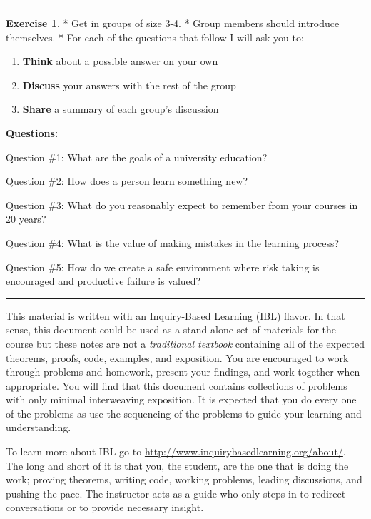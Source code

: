 \documentclass[
]{book}
\providecommand{\tightlist}{%
  \setlength{\itemsep}{0pt}\setlength{\parskip}{0pt}}
\theoremstyle{definition}
\theoremstyle{definition}
\theoremstyle{definition}
\newtheorem{exercise}{Exercise}[chapter]
\theoremstyle{remark}
\begin{document}
\begin{center}\rule{0.5\linewidth}{0.5pt}\end{center}

\begin{exercise}
\protect\hypertarget{exr:unnamed-chunk-2}{}{\label{exr:unnamed-chunk-2} }
* Get in groups of size 3-4.
* Group members should introduce themselves.
* For each of the questions that follow I will ask you to:

\begin{enumerate}
\def\labelenumi{\arabic{enumi}.}
\tightlist
\item
  \textbf{Think} about a possible answer on your own
\item
  \textbf{Discuss} your answers with the rest of the group
\item
  \textbf{Share} a summary of each group's discussion
\end{enumerate}

\textbf{Questions:}

Question \#1: What are the goals of a university education?

Question \#2: How does a person learn something new?

Question \#3: What do you reasonably expect to remember from your courses in 20 years?

Question \#4: What is the value of making mistakes in the learning process?

Question \#5: How do we create a safe environment where risk taking is encouraged and productive failure is valued?
\end{exercise}

\begin{center}\rule{0.5\linewidth}{0.5pt}\end{center}

This material is written with an Inquiry-Based Learning (IBL) flavor. In
that sense, this document could be used as a stand-alone set of
materials for the course but these notes are not a \emph{traditional
textbook} containing all of the expected theorems, proofs, code,
examples, and exposition. You are encouraged to work through problems
and homework, present your findings, and work together when appropriate.
You will find that this document contains collections of problems with
only minimal interweaving exposition. It is expected that you do every
one of the problems as use the sequencing of the problems to guide your learning and understanding.

To learn more about IBL go to
\url{http://www.inquirybasedlearning.org/about/}. The long and short of it
is that you, the student, are the one that is doing the work; proving
theorems, writing code, working problems, leading discussions, and
pushing the pace. The instructor acts as a guide who only steps in to
redirect conversations or to provide necessary insight.
\end{document}
